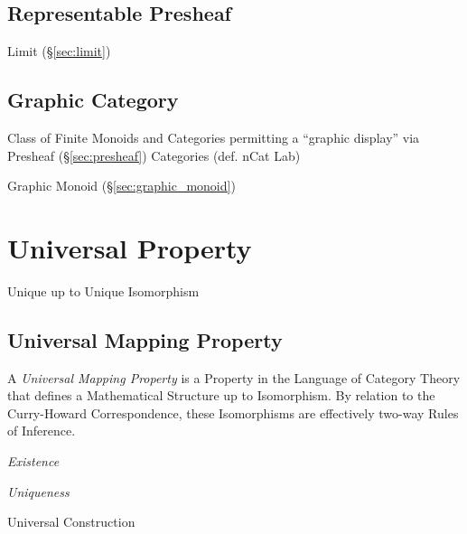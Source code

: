 \subsection{Representable Presheaf}\label{sec:representable_presheaf}

Limit (\S\ref{sec:limit})



\subsection{Graphic Category}\label{sec:graphic_category}

Class of Finite Monoids and Categories permitting a ``graphic
display'' via Presheaf (\S\ref{sec:presheaf}) Categories
(def. nCat Lab) %

Graphic Monoid (\S\ref{sec:graphic_monoid})



\section{Universal Property}\label{sec:universal_property}

Unique up to Unique Isomorphism



\subsection{Universal Mapping Property}
\label{sec:universal_mapping_property}

A \emph{Universal Mapping Property} is a Property in the Language of
Category Theory that defines a Mathematical Structure up to
Isomorphism. By relation to the Curry-Howard Correspondence, these
Isomorphisms are effectively two-way Rules of Inference.

\emph{Existence}

\emph{Uniqueness}

Universal Construction

